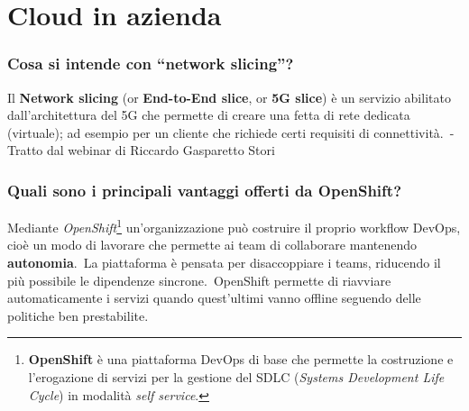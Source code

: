 \documentclass[12pt, a4paper]{article}
\begin{document}
\section{Cloud in azienda}

\subsubsection*{Cosa si intende con ``network slicing''?}
Il \textbf{Network slicing} (or \textbf{End-to-End slice}, or \textbf{5G slice}) è un servizio abilitato dall'architettura del 5G che permette di creare una fetta di rete dedicata (virtuale); ad esempio per un cliente che richiede certi requisiti di connettività.\ - Tratto dal webinar di Riccardo Gasparetto Stori
\subsubsection*{Quali sono i principali vantaggi offerti da OpenShift?}

Mediante \textit{OpenShift}\footnote{\textbf{OpenShift} è una piattaforma DevOps di base che permette la costruzione e l’erogazione di servizi per la gestione del SDLC (\textit{Systems Development Life Cycle}) in modalità \textit{self service}.} un'organizzazione può costruire il proprio workflow DevOps, cioè un modo di lavorare che permette ai team di collaborare mantenendo \textbf{autonomia}.\
La piattaforma è pensata per disaccoppiare i teams, riducendo il più possibile le dipendenze sincrone.\
OpenShift permette di riavviare automaticamente i servizi quando quest'ultimi vanno offline seguendo delle politiche ben prestabilite.
\end{document}
